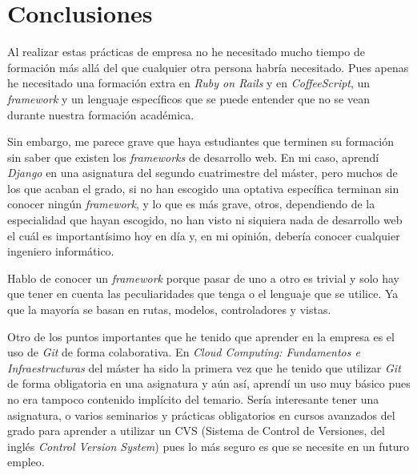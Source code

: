\chapter{Conclusiones}

Al realizar estas prácticas de empresa no he necesitado mucho tiempo de formación más allá del que cualquier otra persona habría necesitado. Pues apenas he necesitado una formación extra en \textit{Ruby on Rails} y en \textit{CoffeeScript}, un \textit{framework} y un lenguaje específicos que se puede entender que no se vean durante nuestra formación académica.

Sin embargo, me parece grave que haya estudiantes que terminen su formación sin saber que existen los \textit{frameworks} de desarrollo web. En mi caso, aprendí \textit{Django} en una asignatura del segundo cuatrimestre del máster, pero muchos de los que acaban el grado, si no han escogido una optativa específica terminan sin conocer ningún \textit{framework}, y lo que es más grave, otros, dependiendo de la especialidad que hayan escogido, no han visto ni siquiera nada de desarrollo web el cuál es importantísimo hoy en día y, en mi opinión, debería conocer cualquier ingeniero informático.

Hablo de conocer un \textit{framework} porque pasar de uno a otro es trivial y solo hay que tener en cuenta las peculiaridades que tenga o el lenguaje que se utilice. Ya que la mayoría se basan en rutas, modelos, controladores y vistas.

Otro de los puntos importantes que he tenido que aprender en la empresa es el uso de \textit{Git} de forma colaborativa. En \textit{Cloud Computing: Fundamentos e Infraestructuras} del máster ha sido la primera vez que he tenido que utilizar \textit{Git} de forma obligatoria en una asignatura y aún así, aprendí un uso muy básico pues no era tampoco contenido implícito del temario. Sería interesante tener una asignatura, o varios seminarios y prácticas obligatorios en cursos avanzados del grado para aprender a utilizar un CVS (Sistema de Control de Versiones, del inglés \textit{Control Version System}) pues lo más seguro es que se necesite en un futuro empleo.